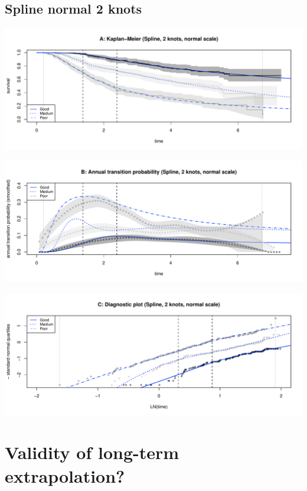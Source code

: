 \documentclass[]{article}
\begin{document}
\subsection{Spline normal 2 knots}\label{spline-normal-2-knots}

\begin{flushleft}\includegraphics[height=0.3\textheight]{images/spline_norm2-1} \end{flushleft}

\begin{flushleft}\includegraphics[height=0.3\textheight]{images/spline_norm2-2} \end{flushleft}

\begin{flushleft}\includegraphics[height=0.3\textheight]{images/spline_norm2-3} \end{flushleft}

\newpage

\section{Validity of long-term
extrapolation?}\label{validity-of-long-term-extrapolation}
\end{document}
